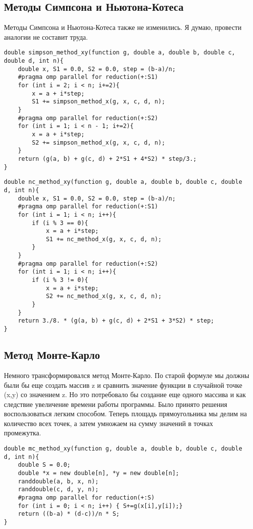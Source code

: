 \documentclass{article}
\begin{document}
\subsection{Методы Симпсона и Ньютона-Котеса}
Методы Симпсона и Ньютона-Котеса также не изменились. Я думаю, провести аналогии не составит труда.
\begin{lstlisting}
double simpson_method_xy(function g, double a, double b, double c, double d, int n){
    double x, S1 = 0.0, S2 = 0.0, step = (b-a)/n;
    #pragma omp parallel for reduction(+:S1)
    for (int i = 2; i < n; i+=2){
        x = a + i*step;
        S1 += simpson_method_x(g, x, c, d, n);
    }
    #pragma omp parallel for reduction(+:S2)
    for (int i = 1; i < n - 1; i+=2){
        x = a + i*step;
        S2 += simpson_method_x(g, x, c, d, n);
    }
    return (g(a, b) + g(c, d) + 2*S1 + 4*S2) * step/3.;
}
\end{lstlisting}
\begin{lstlisting}
double nc_method_xy(function g, double a, double b, double c, double d, int n){
    double x, S1 = 0.0, S2 = 0.0, step = (b-a)/n;
    #pragma omp parallel for reduction(+:S1)
    for (int i = 1; i < n; i++){
        if (i % 3 == 0){
            x = a + i*step;
            S1 += nc_method_x(g, x, c, d, n);
        }
    }
    #pragma omp parallel for reduction(+:S2)
    for (int i = 1; i < n; i++){
        if (i % 3 != 0){
            x = a + i*step;
            S2 += nc_method_x(g, x, c, d, n);
        }
    }
    return 3./8. * (g(a, b) + g(c, d) + 2*S1 + 3*S2) * step;
}
\end{lstlisting}
\subsection{Метод Монте-Карло}
Немного трансформировался метод Монте-Карло. По старой формуле мы должны были бы еще создать массив z и сравнить значение функции в случайной точке (x,y) со значением z. Но это потребовало бы создание еще одного массива и как следствие увеличение времени работы программы. Было принято решения воспользоваться легким способом. Теперь площадь прямоугольника мы делим на количество всех точек, а затем умножаем на сумму значений в точках промежутка.
\begin{lstlisting}
double mc_method_xy(function g, double a, double b, double c, double d, int n){
    double S = 0.0;
    double *x = new double[n], *y = new double[n];
    randdouble(a, b, x, n);
    randdouble(c, d, y, n);
    #pragma omp parallel for reduction(+:S)
    for (int i = 0; i < n; i++) { S+=g(x[i],y[i]);}
    return ((b-a) * (d-c))/n * S;
}
\end{lstlisting}
\end{document}
